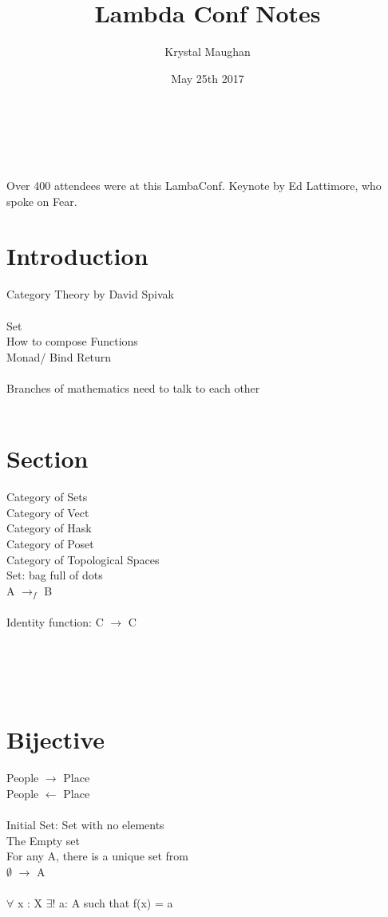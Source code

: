 \documentclass{article}
\title{Lambda Conf Notes}
\author{Krystal Maughan }
\date{May 25th 2017}
\begin{document}
\maketitle

\\
\\
\\
Over 400 attendees were at this LambaConf.
Keynote by Ed Lattimore, who spoke on Fear.
\\
\section{Introduction} 
Category Theory by David Spivak
\\
\\
Set 
\\
How to compose Functions
\\
Monad/ Bind Return
\\
\\
Branches of mathematics need to talk to each other
\\
\\
\section{Section}
Category of Sets
\\
Category of Vect
\\
Category of Hask
\\
Category of Poset
\\
Category of Topological Spaces 
\\
Set: bag full of dots
\\
A $\rightarrow_{f}$ B
\\
\\
Identity function: C $\rightarrow$ C
\\
\\
\\
\\
\\
\section{Bijective}
People $\rightarrow$ Place 
\\
People $\leftarrow$ Place
\\
\\
Initial Set: Set with no elements 
\\
The Empty set
\\
For any A, there is a unique set from
\\
$\emptyset$ $\rightarrow$ A
\\
\\$\forall$ x : X $\exists$! a: A such that f(x) = a
\\
\end{document}
